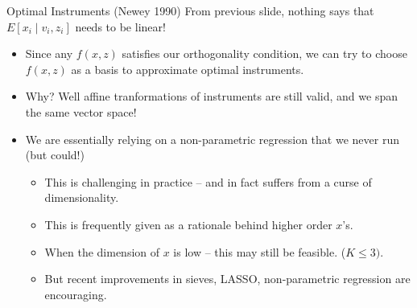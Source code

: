 \documentclass[xcolor=pdftex,dvipsnames,table,mathserif,aspectratio=169]{beamer}
\begin{document}
\begin{frame}{Optimal Instruments (Newey 1990)}
From previous slide, nothing says that $E\left[x_i \mid v_i, z_i \right]$ needs to be \alert{linear}!
\begin{itemize}
\item Since any $f(x,z)$ satisfies our orthogonality condition, we can try to choose $f(x,z)$ as a \alert{basis} to approximate optimal instruments.
\item Why? Well affine tranformations of instruments are still valid, and we span the same vector space!
\item We are essentially relying on a non-parametric regression that we never run (but could!)
\begin{itemize}
\item This is challenging in practice -- and in fact suffers from a curse of dimensionality.
\item This is frequently given as a rationale behind higher order $x$'s.
\item When the dimension of $x$ is low -- this may still be feasible. ($K \leq 3)$.
\item But recent improvements in sieves, LASSO, non-parametric regression are encouraging.
\end{itemize}
\end{itemize}
\end{frame}
\end{document}
